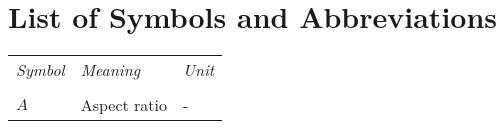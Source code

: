 \section*{List of Symbols and Abbreviations}


\begin{table}[H]
\label{symbolscont}
\begin{tabular}{lll}
\emph{Symbol}   & \emph{Meaning}                            & \emph{Unit}           \\
                &                                           &                       \\
$A$             & Aspect ratio                              & -                    \\


\end{tabular}
\end{table}



